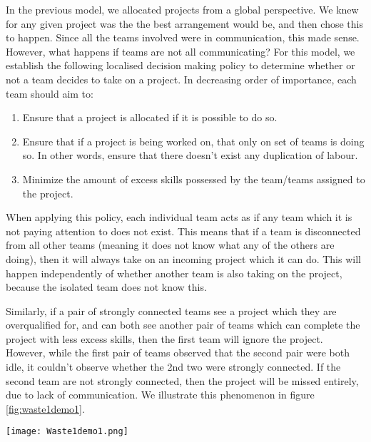 In the previous model, we allocated projects from a global perspective. We knew for any given project was the the best arrangement would be, and then chose this to happen. Since all the teams involved were in communication, this made sense. However, what happens if teams are not all communicating? For this model, we establish the following localised decision making policy to determine whether or not a team decides to take on a project. In decreasing order of importance, each team should aim to:


\begin{enumerate}
	\item Ensure that a project is allocated if it is possible to do so.
	\item Ensure that if a project is being worked on, that only on set of teams is doing so. In other words, ensure that there doesn't exist any duplication of labour.
	\item Minimize the amount of excess skills possessed by the team/teams assigned to the project.
\end{enumerate}

When applying this policy, each individual team acts as if any team which it is not paying attention to does not exist. This means that if a team is disconnected from all other teams (meaning it does not know what any of the others are doing), then it will always take on an incoming project which it can do. This will happen independently of whether another team is also taking on the project, because the isolated team does not know this. 

Similarly, if a pair of strongly connected teams see a project which they are overqualified for, and can both see another pair of teams which can complete the project with less excess skills, then the first team will ignore the project. However, while the first pair of teams observed that the second pair were both idle, it couldn't observe whether the 2nd two were strongly connected. If the second team are not strongly connected, then the project will be missed entirely, due to lack of communication. We illustrate this phenomenon in figure \ref{fig:waste1demo1}.

\begin{SCfigure}
	\centering	
	\texttt{[image: Waste1demo1.png]}
	\caption{In this example we have an incoming project which requires both skills $\alpha$ and $\beta$. Teams $D$ and $E$ would possess these skills if they collaborate which they can do as they are connected, even though they have 2 $\gamma$ skills in excess. However, both $D$ and $E$ can see that the collaboration of $A$ and $B$ can complete the project more efficiently. Thus $D$ and $E$ do not take on the project as they do not know that $A$ and $B$ are not collaborating, and thus won't take the project either. Due to this lack of communication, even though there were plenty of ways that the project might have been done, the project is wasted.}
	\label{fig:waste1demo1}
\end{SCfigure}

